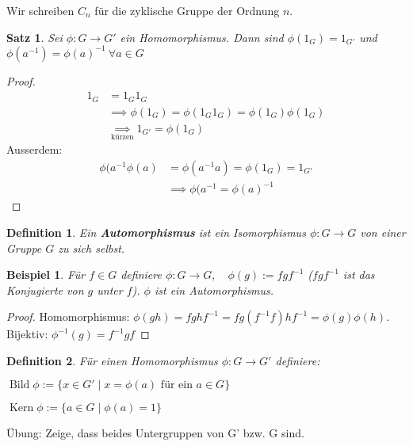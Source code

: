 \documentclass{article}
\theoremstyle{plain}
\newtheorem{definition}{Definition}
\newtheorem{theorem}{Satz}
\newtheorem{beispiel}{Beispiel}
\renewcommand{\ker}{\mathop{\text{Kern}}}
\newcommand{\bild}{\mathop{\text{Bild}}}
\newcommand{\defn}[1]{\textbf{#1}}
\newcommand{\defeq}{:=}
\begin{document}
Wir schreiben $C_n$ für die zyklische Gruppe der Ordnung $n$.

\begin{theorem}
    Sei $\phi\colon G\to G'$ ein Homomorphismus. Dann sind $\phi(1_G)=1_{G'}$ und $\phi(a^{-1})=\phi(a)^{-1}\ \forall a\in G$
\end{theorem}
\begin{proof}
\begin{align*}
    1_G&=1_G1_G\\
    &\implies \phi(1_G)=\phi(1_G1_G)=\phi(1_G)\phi(1_G)\\
    &\underset{\text{kürzen}}{\implies}1_{G'}=\phi(1_G)
\end{align*}
Ausserdem: 
\begin{align*}
    \phi(a^{-1}\phi(a) &= \phi(a^{-1}a)=\phi(1_G)=1_{G'}\\
    &\implies \phi(a^{-1}=\phi(a)^{-1}
\end{align*}
\end{proof}

\begin{definition}
    Ein \defn{Automorphismus} ist ein Isomorphismus $\phi\colon G\to G$ von einer Gruppe $G$ zu sich selbst.
\end{definition}

\begin{beispiel}
    Für $f\in G$ definiere $\phi\colon G\to G,\quad \phi(g)\defeq fgf^{-1}$ ($fgf^{-1}$ ist das Konjugierte von $g$ unter $f$).
    $\phi$ ist ein Automorphismus.
\end{beispiel}
\begin{proof}
    Homomorphismus: $\phi(gh)=fghf^{-1}=fg(f^{-1}f)hf^{-1}=\phi(g)\phi(h)$.
    Bijektiv: $\phi^{-1}(g)=f^{-1}gf$
\end{proof}

\begin{definition}
    Für einen Homomorphismus $\phi\colon G\to G'$ definiere:

    $\bild\phi\defeq \{x\in G'\mid x=\phi(a) \text{ für ein } a\in G\}$

    $\ker\phi\defeq \{a\in G\mid \phi(a)=1\}$
\end{definition}
Übung: Zeige, dass beides Untergruppen von G' bzw. G sind.
\end{document}
